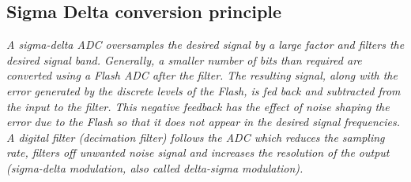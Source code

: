 \subsection{Sigma Delta conversion principle}
\textit{A sigma-delta ADC oversamples the desired signal by a large factor and filters the desired signal band. Generally, a smaller number of bits than required are converted using a Flash ADC after the filter. The resulting signal, along with the error generated by the discrete levels of the Flash, is fed back and subtracted from the input to the filter. This negative feedback has the effect of noise shaping the error due to the Flash so that it does not appear in the desired signal frequencies. A digital filter (decimation filter) follows the ADC which reduces the sampling rate, filters off unwanted noise signal and increases the resolution of the output (sigma-delta modulation, also called delta-sigma modulation).}



